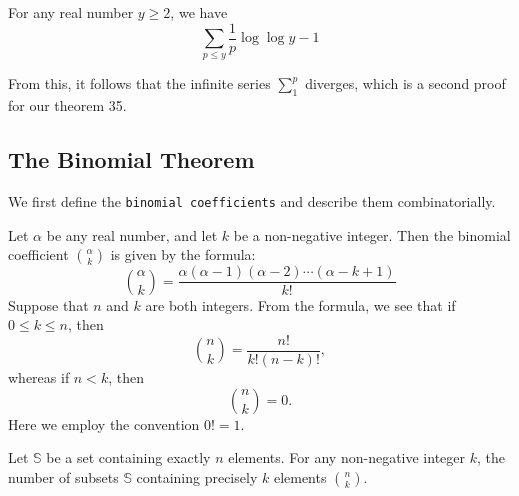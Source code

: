 \documentclass[11pt]{article}
\begin{document}
\begin{theorem}
    For any real number \(y \geqslant 2\), we have
    \[\sum_{p \leqslant y} \frac{1}{p} \log \log y - 1\]
\end{theorem}

\begin{fact}
    From this, it follows that the infinite series \(\sum_{1}^{p}\) diverges, which is a second proof for our theorem 35.
\end{fact}

\subsection{The Binomial Theorem}
We first define the \texttt{binomial coefficients} and describe them
combinatorially.

\begin{definition}
    Let \(\alpha\) be any real number, and let \(k\) be a non-negative integer. Then the binomial coefficient \(\binom{\alpha}{k}\) is given by the formula:
    \[
        \binom{\alpha}{k} = \frac{\alpha(\alpha - 1)(\alpha - 2) \cdots (\alpha - k + 1)}{k!}
    \]
    Suppose that \(n\) and \(k\) are both integers. From the formula, we see that
    if \(0 \leq k \leq n\), then
    \[
        \binom{n}{k} = \frac{n!}{k!(n - k)!},
    \]
    whereas if \(n < k\), then
    \[
        \binom{n}{k} = 0.
    \]
    Here we employ the convention \(0! = 1\).
\end{definition}

\begin{theorem}
    Let \(\mathbb{S}\) be a set containing exactly \(n\) elements. For any non-negative integer \(k\), the number of subsets \(\mathbb{S}\) containing precisely \(k\) elements \(\binom{n}{k}\).
\end{theorem}
\end{document}
